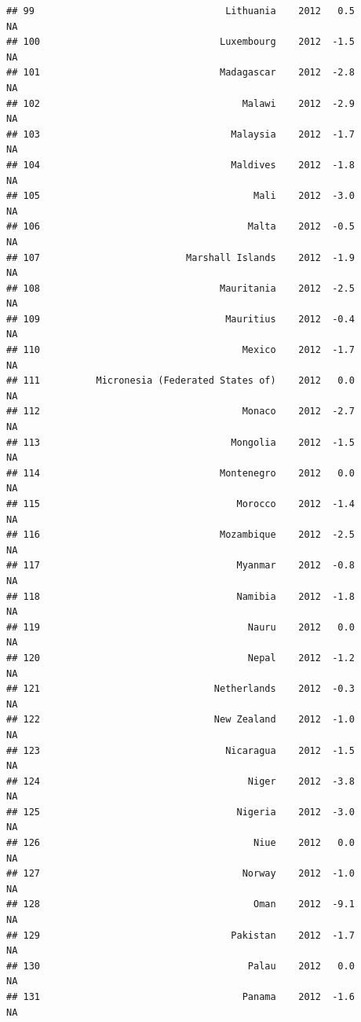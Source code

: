 \documentclass[
]{book}
\begin{document}
\begin{verbatim}
## 99                                  Lithuania    2012   0.5              NA
## 100                                Luxembourg    2012  -1.5              NA
## 101                                Madagascar    2012  -2.8              NA
## 102                                    Malawi    2012  -2.9              NA
## 103                                  Malaysia    2012  -1.7              NA
## 104                                  Maldives    2012  -1.8              NA
## 105                                      Mali    2012  -3.0              NA
## 106                                     Malta    2012  -0.5              NA
## 107                          Marshall Islands    2012  -1.9              NA
## 108                                Mauritania    2012  -2.5              NA
## 109                                 Mauritius    2012  -0.4              NA
## 110                                    Mexico    2012  -1.7              NA
## 111          Micronesia (Federated States of)    2012   0.0              NA
## 112                                    Monaco    2012  -2.7              NA
## 113                                  Mongolia    2012  -1.5              NA
## 114                                Montenegro    2012   0.0              NA
## 115                                   Morocco    2012  -1.4              NA
## 116                                Mozambique    2012  -2.5              NA
## 117                                   Myanmar    2012  -0.8              NA
## 118                                   Namibia    2012  -1.8              NA
## 119                                     Nauru    2012   0.0              NA
## 120                                     Nepal    2012  -1.2              NA
## 121                               Netherlands    2012  -0.3              NA
## 122                               New Zealand    2012  -1.0              NA
## 123                                 Nicaragua    2012  -1.5              NA
## 124                                     Niger    2012  -3.8              NA
## 125                                   Nigeria    2012  -3.0              NA
## 126                                      Niue    2012   0.0              NA
## 127                                    Norway    2012  -1.0              NA
## 128                                      Oman    2012  -9.1              NA
## 129                                  Pakistan    2012  -1.7              NA
## 130                                     Palau    2012   0.0              NA
## 131                                    Panama    2012  -1.6              NA

\end{verbatim}
\end{document}
